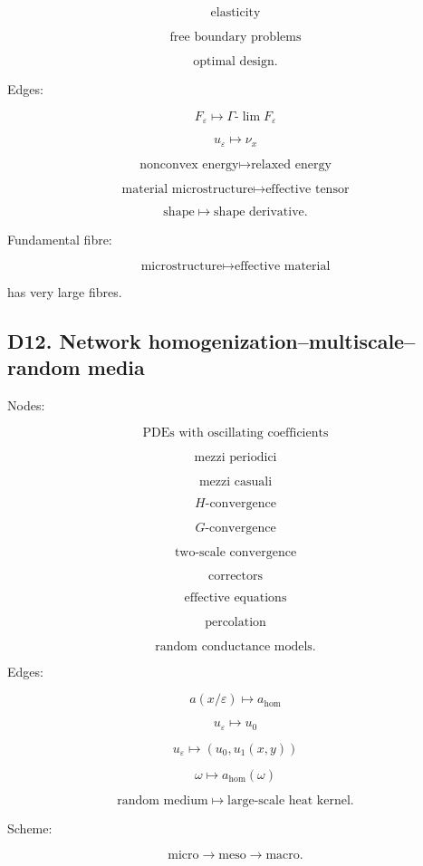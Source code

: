 \documentclass[11pt]{article}
\begin{document}
\[
\text{elasticity}
\]

\[
\text{free boundary problems}
\]

\[
\text{optimal design}.
\]

Edges:

\[
F_\varepsilon\mapsto \Gamma\text{-}\lim F_\varepsilon
\]

\[
u_\varepsilon\mapsto \nu_x
\]

\[
\text{nonconvex energy}\mapsto \text{relaxed energy}
\]

\[
\text{material microstructure}\mapsto \text{effective tensor}
\]

\[
\text{shape}\mapsto \text{shape derivative}.
\]

Fundamental fibre:

\[
\text{microstructure}\mapsto \text{effective material}
\]

has very large fibres.



\subsection{D12. Network homogenization--multiscale--random media}

Nodes:

\[
\text{PDEs with oscillating coefficients}
\]

\[
\text{mezzi periodici}
\]

\[
\text{mezzi casuali}
\]

\[
H\text{-convergence}
\]

\[
G\text{-convergence}
\]

\[
\text{two-scale convergence}
\]

\[
\text{correctors}
\]

\[
\text{effective equations}
\]

\[
\text{percolation}
\]

\[
\text{random conductance models}.
\]

Edges:

\[
a(x/\varepsilon)\mapsto a_{\mathrm{hom}}
\]

\[
u_\varepsilon\mapsto u_0
\]

\[
u_\varepsilon\mapsto (u_0,u_1(x,y))
\]

\[
\omega\mapsto a_{\mathrm{hom}}(\omega)
\]

\[
\text{random medium}\mapsto \text{large-scale heat kernel}.
\]

Scheme:

\[
\text{micro}
\to
\text{meso}
\to
\text{macro}.
\]
\end{document}
